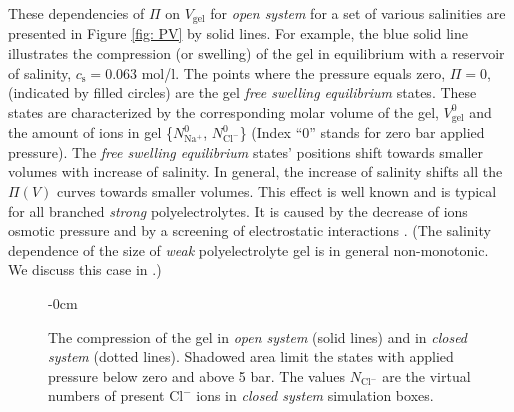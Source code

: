 \documentclass[journal,article,submit,pdftex,moreauthors]{Definitions/mdpi}
\newcommand{\ncl}{n_\mathrm{Cl^-}}
\newcommand{\Nna}{N_\mathrm{Na^+}}
\newcommand{\Ncl}{N_\mathrm{Cl^-}}
\newcommand{\cl}{\mathrm{Cl^-}}
\newcommand{\cs}{c_{\mathrm{s}}}
\newcommand{\Vgel}{V_\mathrm{gel}}
\newcommand{\Pgel}{\Pi}
\begin{document}
These dependencies of $\Pgel$ on $\Vgel$ for \emph{open system} for a set of various salinities are presented
in Figure \ref{fig: PV} by solid lines. 
For example, the blue solid line illustrates the compression (or swelling) of the gel in equilibrium with a reservoir of salinity, $\cs=0.063$ mol/l. 
The points where the pressure equals zero, $\Pgel=0$, (indicated by filled circles) are the gel \emph{free swelling equilibrium} states.
These states are characterized by the corresponding molar volume of the gel, $\Vgel^0$ and the amount of ions in gel \{$\Nna^0$, $\Ncl^0$\} 
(Index ``0'' stands for zero bar applied pressure).
The \emph{free swelling equilibrium} states' positions shift towards smaller volumes with increase of salinity. 
In general, the increase of salinity shifts all the $\Pgel(V)$ curves towards smaller volumes.
This effect is well known and is typical for all branched \emph{strong} polyelectrolytes. 
It is caused by the decrease of ions osmotic pressure and by a screening of electrostatic interactions \cite{Zhulina2000, Landsgesel2020a}.
(The salinity dependence of the size of \emph{weak} polyelectrolyte gel is in general non-monotonic. We discuss this case in \cite{Rud2018}.)

\begin{figure}[h]
\begin{adjustwidth}{-\extralength}{0cm}
\hspace{0.02\textwidth}
\caption{The compression of the gel in \emph{open system} (solid lines) and in \emph{closed system} (dotted lines). 
Shadowed area limit the states with applied pressure below zero and above 5 bar.
The values $N_\cl$ are the virtual numbers of present $\cl$ ions in \emph{closed system} simulation boxes.
\label{fig: NV and CN}}
\end{adjustwidth}
\end{figure}
\end{document}
